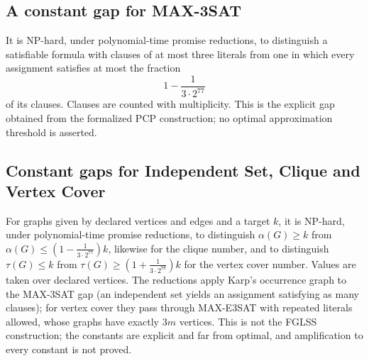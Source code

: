 \begin{result}
\subsection{A constant gap for MAX-3SAT}
It is NP-hard, under polynomial-time promise reductions, to distinguish a
satisfiable formula with clauses of at most three literals from one in which
every assignment satisfies at most the fraction
\[
1-\frac{1}{3\cdot 2^{77}}
\]
of its clauses. Clauses are counted with multiplicity. This is the explicit gap
obtained from the formalized PCP construction; no optimal approximation threshold
is asserted.\citep{AroraLundMotwaniSudanSzegedy1998,Dinur2007}
\end{result}

\begin{result}
\subsection{Constant gaps for Independent Set, Clique and Vertex Cover}
For graphs given by declared vertices and edges and a target $k$, it is NP-hard, under
polynomial-time promise reductions, to distinguish $\alpha(G)\ge k$ from
$\alpha(G)\le(1-\frac{1}{3\cdot 2^{77}})k$, likewise for the clique number, and to distinguish
$\tau(G)\le k$ from $\tau(G)\ge(1+\frac{1}{3\cdot 2^{78}})k$ for the vertex cover number. Values
are taken over declared vertices. The reductions apply Karp's occurrence graph to the MAX-3SAT gap
(an independent set yields an assignment satisfying as many clauses); for vertex cover they pass
through MAX-E3SAT with repeated literals allowed, whose graphs have exactly $3m$ vertices. This is
not the FGLSS construction; the constants are explicit and far from optimal, and amplification to
every constant is not proved.\citep{AroraLundMotwaniSudanSzegedy1998}\citep[Chapter 11]{AroraBarak09}
\end{result}

